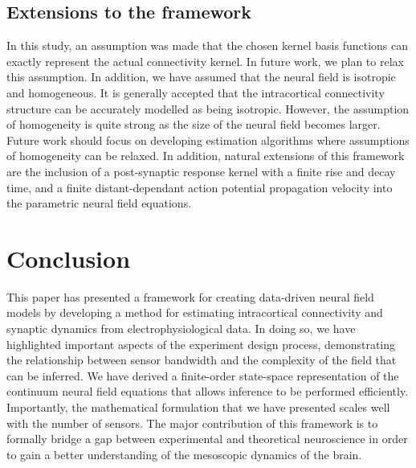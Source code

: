 \documentclass[review,authoryear,3p]{elsarticle}
\begin{document}
\subsection{Extensions to the framework}
In this study, an assumption was made that the chosen kernel basis functions can exactly represent the actual connectivity kernel. In future work, we plan to relax this assumption. In addition, we have assumed that the neural field is isotropic and homogeneous. It is generally accepted that the intracortical connectivity structure can be accurately modelled as being isotropic. However, the assumption of homogeneity is quite strong as the size of the neural field becomes larger. Future work should focus on developing estimation algorithms where assumptions of homogeneity can be relaxed. In addition, natural extensions of this framework are the inclusion of a post-synaptic response kernel with a finite rise and decay time, and a finite distant-dependant action potential propagation velocity into the parametric neural field equations.

\section{Conclusion}
This paper has presented a framework for creating data-driven neural field models by developing a method for estimating intracortical connectivity and synaptic dynamics from electrophysiological data. In doing so, we have highlighted important aspects of the experiment design process, demonstrating the relationship between sensor bandwidth and the complexity of the field that can be inferred. We have derived a finite-order state-space representation of the continuum neural field equations that allows inference to be performed efficiently. Importantly, the mathematical formulation that we have presented scales well with the number of sensors. The major contribution of this framework is to formally bridge a gap between experimental and theoretical neuroscience in order to gain a better understanding of the mesoscopic dynamics of the brain.
\end{document}
